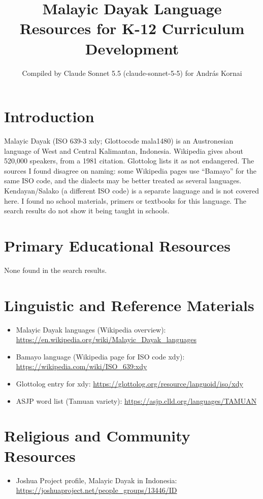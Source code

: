 \documentclass[12pt]{article}
\title{Malayic Dayak Language Resources for K-12 Curriculum Development}
\author{Compiled by Claude Sonnet 5.5 (claude-sonnet-5-5) for Andr\'as Kornai}
\date{}
\begin{document}
\maketitle

\section{Introduction}
Malayic Dayak (ISO 639-3 xdy; Glottocode mala1480) is an Austronesian language of West and Central Kalimantan, Indonesia. Wikipedia gives about 520,000 speakers, from a 1981 citation. Glottolog lists it as not endangered. The sources I found disagree on naming: some Wikipedia pages use ``Bamayo'' for the same ISO code, and the dialects may be better treated as several languages. Kendayan/Salako (a different ISO code) is a separate language and is not covered here. I found no school materials, primers or textbooks for this language. The search results do not show it being taught in schools.

\section{Primary Educational Resources}
None found in the search results.

\section{Linguistic and Reference Materials}
\begin{itemize}
\item Malayic Dayak languages (Wikipedia overview): \url{https://en.wikipedia.org/wiki/Malayic_Dayak_languages}
\item Bamayo language (Wikipedia page for ISO code xdy): \url{https://wikipedia.com/wiki/ISO_639:xdy}
\item Glottolog entry for xdy: \url{https://glottolog.org/resource/languoid/iso/xdy}
\item ASJP word list (Tamuan variety): \url{https://asjp.clld.org/languages/TAMUAN}
\end{itemize}

\section{Religious and Community Resources}
\begin{itemize}
\item Joshua Project profile, Malayic Dayak in Indonesia: \url{https://joshuaproject.net/people_groups/13446/ID}
\end{itemize}
\end{document}

